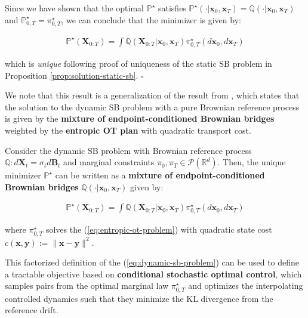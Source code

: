 \documentclass{article}
\newcommand{\boldtext}[1]{\textbf{\textcolor{MyGreen}{#1}}}
\begin{document}
Since we have shown that the optimal $\mathbb{P}^\star$ satisfies $\mathbb{P}^\star(\cdot|\boldsymbol{x}_0, \boldsymbol{x}_T)=\mathbb{Q}(\cdot|\boldsymbol{x}_0, \boldsymbol{x}_T)$ and $\mathbb{P}^\star_{0,T}=\pi^\star_{0,T}$, we can conclude that the minimizer is given by:
\begin{small}
\begin{align}
    \boxed{\mathbb{P}^\star(\boldsymbol{X}_{0:T})=\int\mathbb{Q}(\boldsymbol{X}_{0:T}|\boldsymbol{x}_0, \boldsymbol{x}_T)\pi^\star_{0,T}(d\boldsymbol{x}_0,d\boldsymbol{x}_T)}
\end{align}
\end{small}
which is \textit{unique} following proof of uniqueness of the static SB problem in Proposition \ref{prop:solution-static-sb}. \hfill $\square$

We note that this result is a generalization of the result from \citet{follmer2006random}, which states that the solution to the dynamic SB problem with a pure Brownian reference process is given by the \textbf{mixture of endpoint-conditioned Brownian bridges} weighted by the \textbf{entropic OT plan} with quadratic transport cost.

\begin{corollary}\label{corollary:mixture-brownian}
    Consider the dynamic SB problem with Brownian reference process $\mathbb{Q}:d\boldsymbol{X}_t=\sigma_td\boldsymbol{B}_t$ and marginal constraints $\pi_0,\pi_T\in \mathcal{P}(\mathbb{R}^d)$. Then, the unique minimizer $\mathbb{P}^\star$ can be written as a \textbf{mixture of endpoint-conditioned Brownian bridges} $\mathbb{Q}(\cdot|\boldsymbol{x}_0, \boldsymbol{x}_T)$ given by:
    \begin{small}
    \begin{align}
        \mathbb{P}^\star(\boldsymbol{X}_{0:T})=\int\mathbb{Q}(\boldsymbol{X}_{0:T}|\boldsymbol{x}_0, \boldsymbol{x}_T)\pi^\star_{0,T}(d\boldsymbol{x}_0,d\boldsymbol{x}_T)\tag{Mixture of Brownian Bridges}
    \end{align}
    \end{small}
    where $\pi^\star_{0,T}$ solves the (\ref{eq:entropic-ot-problem}) with quadratic state cost $c(\boldsymbol{x}, \boldsymbol{y}):= \|\boldsymbol{x}-\boldsymbol{y}\|^2 $.
\end{corollary}

This factorized definition of the (\ref{eq:dynamic-sb-problem}) can be used to define a tractable objective based on \boldtext{conditional stochastic optimal control}, which samples pairs from the optimal marginal law $\pi^\star_{0,T}$ and optimizes the interpolating controlled dynamics such that they minimize the KL divergence from the reference drift.
\end{document}
